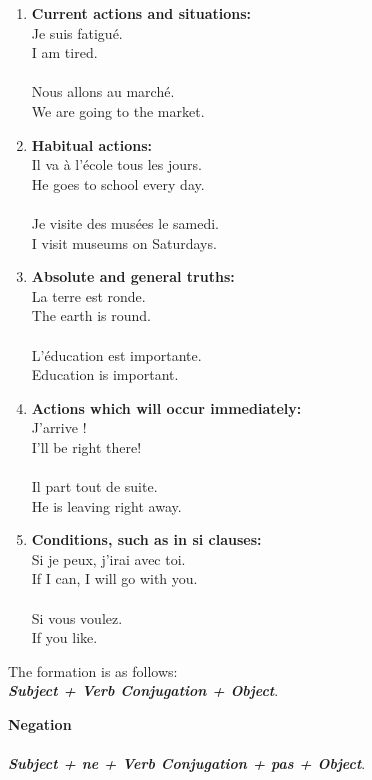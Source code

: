 \begin{enumerate}

\item{\textbf{Current actions and situations:}\\
Je suis fatigu\'{e}.\\
I am tired.\\\\
Nous allons au march\'{e}.\\
We are going to the market.}

\item{\textbf{Habitual actions:}\\
Il va \`{a} l'\'{e}cole tous les jours.\\
He goes to school every day.\\\\
Je visite des mus\'{e}es le samedi.\\
I visit museums on Saturdays.}

\item{\textbf{Absolute and general truths:}\\
La terre est ronde.\\
The earth is round.\\\\
L'\'{e}ducation est importante.\\
Education is important.}

\item{\textbf{Actions which will occur immediately:}\\
J'arrive !\\
I'll be right there!\\\\
Il part tout de suite.\\
He is leaving right away.}

\item{\textbf{Conditions, such as in si clauses:}\\
Si je peux, j'irai avec toi.\\
If I can, I will go with you.\\\\
Si vous voulez.\\
If you like.}
\end{enumerate}

\noindent The formation is as follows:\\

\textbf{\emph{Subject + Verb Conjugation + Object}}.

\vspace{0.2in}
\noindent \textbf{Negation}\\\\
\textbf{\emph{Subject + ne + Verb Conjugation + pas + Object}}.

